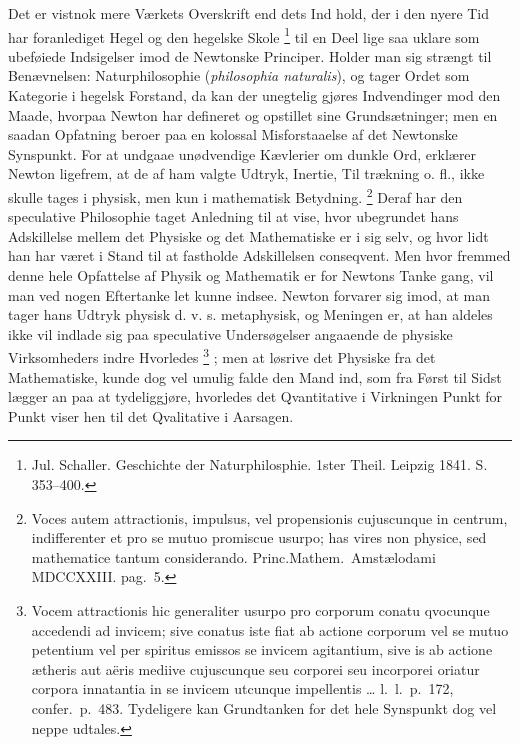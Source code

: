 \documentclass[12pt,a4paper]{book}
\renewcommand{\thefootnote}{*)}
\begin{document}
Det er vistnok mere Værkets Overskrift end dets Ind\-%
hold, der i den nyere Tid har foranlediget Hegel og den hegelske
Skole%
\footnote{%
Jul. Schaller. Geschichte der Naturphilosphie. 1ster Theil.
Leipzig 1841. S. 353--400.}
til en Deel lige saa uklare som ubeføiede Indsigelser imod de
Newtonske Principer. Holder man sig strængt til Benævnelsen:
Naturphilosophie (\textit{philosophia naturalis}), og tager Ordet
som Kategorie i hegelsk Forstand, da kan der unegtelig gjøres
Indvendinger mod den Maade, hvorpaa Newton har defineret og
opstillet sine Grundsætninger; men en saadan Opfatning beroer paa
en kolossal Misforstaaelse af det Newtonske Synspunkt. For at
undgaae unødvendige Kævlerier om dunkle Ord, erklærer Newton
ligefrem, at de af ham valgte Udtryk, Inertie, Til\-%
trækning o. fl., ikke skulle tages i physisk, men kun i
mathematisk Betydning.%
\renewcommand{\thefootnote}{**)}%
\footnote{%
Voces autem attractionis, impulsus, vel propensionis cujuscunque in
centrum, indifferenter et pro se mutuo promiscue usurpo; has vires
non physice, sed mathematice tantum considerando.
Princ.Mathem.\ Amstælodami MDCCXXIII. pag.\ 5.}%
\renewcommand{\thefootnote}{*)}
Deraf har den speculative Philosophie taget Anledning til at vise,
hvor ubegrundet hans Adskillelse mellem det Physiske og det
Mathematiske er i sig selv, og hvor lidt han har været i Stand til
at fastholde Adskillelsen conseqvent. Men hvor fremmed denne hele
Opfattelse af Physik og Mathematik er for Newtons Tanke\-%
gang, vil man ved nogen Eftertanke let kunne indsee. Newton
forvarer sig imod, at man tager hans Udtryk physisk d. v. s.
metaphysisk, og Meningen er, at han aldeles ikke vil indlade sig
paa speculative Undersøgelser
angaaende de physiske Virksomheders indre Hvorledes%
\footnote{%
Vocem attractionis hic generaliter usurpo pro corporum conatu
qvocunque accedendi ad invicem; sive conatus iste fiat ab actione
corporum vel se mutuo petentium vel per spiritus emissos se invicem
agitantium, sive is ab actione ætheris aut aëris mediive cujuscunque
seu corporei seu incorporei oriatur corpora innatantia in se invicem
utcunque impellentis \ldots{} l.\ l.\ p.\ 172, confer.\ p.\ 483.
Tydeligere kan Grundtanken for det hele Synspunkt dog vel neppe
udtales.}%
; men at løsrive det Physiske fra det Mathematiske, kunde dog vel
umulig falde den Mand ind, som fra Først til Sidst lægger an paa at
tydeliggjøre, hvorledes det Qvantitative i Virkningen Punkt for
Punkt viser hen til det Qvalitative i Aarsagen.
\end{document}
